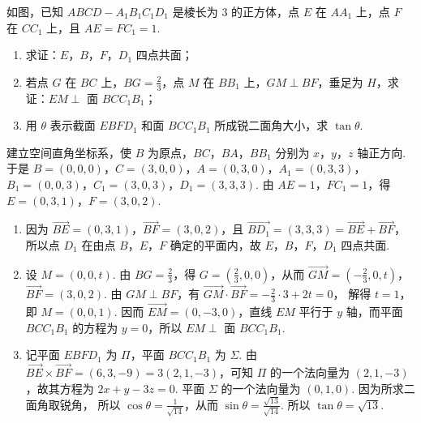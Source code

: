 \begin{problem}
如图，已知 \(ABCD - A_{1}B_{1}C_{1}D_{1}\) 是棱长为 \(3\) 的正方体，点 \(E\) 在 \(AA_{1}\) 上，点 \(F\) 在 \(CC_{1}\) 上，且 \(AE = FC_{1} = 1\).

\begin{enumerate}
\item 求证：\(E\)，\(B\)，\(F\)，\(D_{1}\) 四点共面；
\item 若点 \(G\) 在 \(BC\) 上，\(BG = \frac{2}{3}\)，点 \(M\) 在 \(BB_{1}\) 上，\(GM \perp BF\)，垂足为 \(H\)，求证：\(EM \perp\) 面 \(BCC_{1}B_{1}\)；
\item 用 \(\theta\) 表示截面 \(EBFD_{1}\) 和面 \(BCC_{1}B_{1}\) 所成锐二面角大小，求 \(\tan\theta\).
\end{enumerate}

\end{problem}

\begin{solution}
建立空间直角坐标系，使 \(B\) 为原点，\(BC\)，\(BA\)，\(BB_{1}\) 分别为 \(x\)，\(y\)，\(z\) 轴正方向. 于是
\(B=(0,0,0)\)，\(C=(3,0,0)\)，\(A=(0,3,0)\)，\(A_{1}=(0,3,3)\)，\(B_{1}=(0,0,3)\)，\(C_{1}=(3,0,3)\)，\(D_{1}=(3,3,3)\).
由 \(AE=1\)，\(FC_{1}=1\)，得 \(E=(0,3,1)\)，\(F=(3,0,2)\).

\begin{enumerate}
\item 因为 \(\overrightarrow{BE}=(0,3,1)\)，\(\overrightarrow{BF}=(3,0,2)\)，且 \(\overrightarrow{BD_{1}}=(3,3,3)=\overrightarrow{BE}+\overrightarrow{BF}\)，
所以点 \(D_{1}\) 在由点 \(B\)，\(E\)，\(F\) 确定的平面内，故 \(E\)，\(B\)，\(F\)，\(D_{1}\) 四点共面.
\item 设 \(M=(0,0,t)\). 由 \(BG=\frac{2}{3}\)，得 \(G=\left(\frac{2}{3},0,0\right)\)，从而
\(\overrightarrow{GM}=\left(-\frac{2}{3},0,t\right)\)，\(\overrightarrow{BF}=(3,0,2)\).
由 \(GM\perp BF\)，有 \(\overrightarrow{GM}\cdot\overrightarrow{BF}=-\frac{2}{3}\cdot3+2t=0\)，
解得 \(t=1\)，即 \(M=(0,0,1)\). 因而 \(\overrightarrow{EM}=(0,-3,0)\)，直线 \(EM\) 平行于 \(y\) 轴，而平面 \(BCC_{1}B_{1}\) 的方程为 \(y=0\)，所以 \(EM\perp\) 面 \(BCC_{1}B_{1}\).
\item 记平面 \(EBFD_{1}\) 为 \(\Pi\)，平面 \(BCC_{1}B_{1}\) 为 \(\Sigma\). 由 \(\overrightarrow{BE}\times\overrightarrow{BF}=(6,3,-9)=3(2,1,-3)\)，可知 \(\Pi\) 的一个法向量为 \((2,1,-3)\)，故其方程为 \(2x+y-3z=0\). 平面 \(\Sigma\) 的一个法向量为 \((0,1,0)\). 因为所求二面角取锐角，
所以 \(\cos\theta=\frac{1}{\sqrt{14}}\)，从而 \(\sin\theta=\frac{\sqrt{13}}{\sqrt{14}}\).
所以 \(\tan\theta=\sqrt{13}\).
\end{enumerate}
\end{solution}

